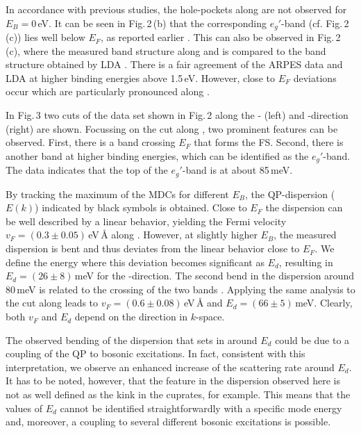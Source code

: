 \documentclass[preprint,showpacs,preprintnumbers,amsmath,amssymb,twoside,aps]{revtex4}
\begin{document}
In accordance with previous studies, the hole-pockets along \GK\/ are not observed for $E_B=0$\,eV.  It can be seen in Fig.\,2\,(b) that the
corresponding $e_g'$-band (cf. Fig.\,2\,(c)) lies well below $E_F$, as reported earlier \cite{YangPRL05}.
%
This can also be observed in Fig.\,2\,(c), where the measured band structure along \GK \/ and \GM \/ is compared to the band structure obtained by
LDA \cite{SinghPRB00}. There is a fair agreement of the ARPES data and LDA at higher binding energies above 1.5\,eV. However, close to $E_F$
deviations occur which are particularly pronounced along \GK.
%


In Fig.\,3 two cuts of the data set shown in Fig.\,2 along the \GK- (left) and \GM-direction (right) are shown.
%
Focussing on the cut along  \GK , two prominent features can be observed. First, there is a band crossing $E_F$ that forms the FS. Second, there is
another band at higher binding energies, which can be identified as the $e_g'$-band. The data indicates that the top of the $e_g'$-band is at about
85\,meV.

By tracking the maximum of the MDCs for different $E_B$, the QP-dispersion ($E(k)$) indicated by black symbols is obtained. Close to $E_F$ the
dispersion can be well described by a linear behavior, yielding the Fermi velocity  $v_F=(0.3\pm0.05)$\,eV\,\AA \/ along \GK .
%
However, at slightly higher $E_B$, the measured dispersion is bent and thus deviates from the linear behavior close to $E_F$.
%
We define the energy where this deviation becomes significant as $E_d$, resulting in $E_d=(26\pm 8)$\,meV for the \GK-direction. The second bend in
the dispersion around 80\,meV is related to the crossing of the two bands \cite{QianPRL06b}.
Applying the same analysis to the cut along \GM\/ leads to $v_F=(0.6\pm0.08)$\,eV\,\AA\/ and $E_d=(66 \pm 5)$\,meV. Clearly, both $v_F$ and $E_d$
depend on the direction in $k$-space.

The observed bending of the dispersion that sets in around $E_d$ could be due to a coupling of the QP to bosonic excitations. In fact, consistent
with this interpretation, we observe an enhanced increase of the scattering rate around $E_d$.
%
It has to be noted, however, that the feature in the dispersion observed here is not as well defined as the kink in the cuprates, for example. This
means that  the values of $E_d$ cannot be identified straightforwardly with a specific mode energy and, moreover, a coupling to several different
bosonic excitations is possible.
\end{document}
